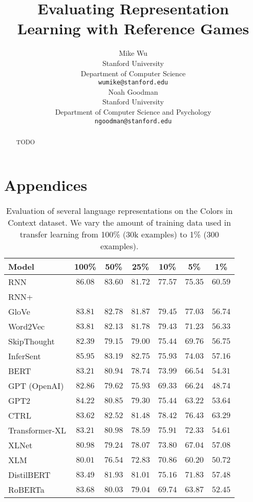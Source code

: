 \documentclass[11pt,a4paper]{article}
\title{Evaluating Representation Learning with Reference Games}
\author{Mike Wu \\
  Stanford University \\
  Department of Computer Science \\
  \texttt{wumike@stanford.edu} \\ \And
  Noah Goodman \\
  Stanford University \\
  Department of Computer Science and Psychology \\
  \texttt{ngoodman@stanford.edu} \\}
\date{}
\begin{document}
\maketitle
\begin{abstract}
TODO
\end{abstract}




\appendix

\section{Appendices}
\label{sec:appendix}

\begin{table*}[t!]
\centering
\begin{tabular}{lcccccc}
\hline
\textbf{Model} & \textbf{100\%} & \textbf{50\%} & \textbf{25\%} & \textbf{10\%} & \textbf{5\%} & \textbf{1\%} \\
\hline
RNN & $\mathbf{86.08}$ & $\mathbf{83.60}$ & $81.72$ & $77.57$ & $75.35$ & $60.59$ \\
RNN+ & & & & & & \\
GloVe & $83.81$ & $82.78$ & $81.87$ & $\mathbf{79.45}$ & $\mathbf{77.03}$ & $56.74$ \\
Word2Vec & $83.81$ & $82.13$ & $81.78$ & $79.43$ & $71.23$ & $56.33$ \\
SkipThought & $82.39$ & $79.15$ & $79.00$ & $75.44$ & $69.76$ & $56.75$ \\
InferSent & $85.95$ & $83.19$ & $\mathbf{82.75}$ & $75.93$ & $74.03$ & $57.16$ \\
BERT & $83.21$ & $80.94$ & $78.74$ & $73.99$ & $66.54$ & $54.31$ \\
GPT (OpenAI) & $82.86$ & $79.62$ & $75.93$ & $69.33$ & $66.24$ & $48.74$ \\
GPT2 & $84.22$ & $80.85$ & $79.30$ & $75.44$ & $63.22$ & $53.64$ \\
CTRL & $83.62$ & $82.52$ & $81.48$ & $78.42$ & $76.43$ & $\mathbf{63.29}$ \\
Transformer-XL & $83.21$ & $80.98$ & $78.59$ & $75.91$ & $72.33$ & $54.61$ \\
XLNet & $80.98$ & $79.24$ & $78.07$ & $73.80$ & $67.04$ & $57.08$ \\
XLM & $80.01$ & $76.54$ & $72.83$ & $70.86$ & $60.20$ & $50.72$ \\
DistilBERT & $83.49$ & $81.93$ & $81.01$ & $75.16$ & $71.83$ & $57.48$ \\
RoBERTa & $83.68$ & $80.03$ & $79.04$ & $69.74$ & $63.87$ & $52.45$ \\
\hline
\end{tabular}
\caption{\label{table:colors} Evaluation of several language representations on the Colors in Context dataset. We vary the amount of training data used in transfer learning from 100\% (30k examples) to 1\% (300 examples).}
\end{table*}
\end{document}
